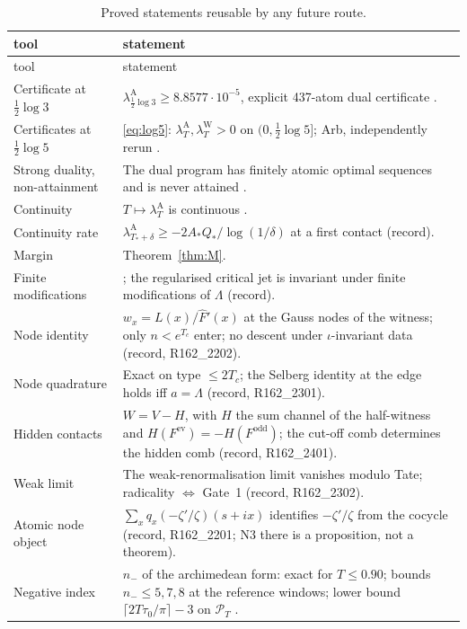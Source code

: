 \documentclass[11pt]{amsart}
\theoremstyle{definition}
\theoremstyle{remark}
\newcommand{\PT}{\mathcal P_T}
\newcommand{\lamA}{\lambda^{\mathrm A}_T}
\newcommand{\lamW}{\lambda^{\mathrm W}_T}
\begin{document}
\begin{longtable}{@{}p{4.2cm}p{10.3cm}@{}}
\caption{Proved statements reusable by any future route.}\label{tab:tools}\\
\toprule
tool & statement \\
\midrule\endfirsthead
\toprule tool & statement \\ \midrule\endhead
\bottomrule\endfoot
Certificate at $\frac12\log3$ & $\lambda^{\mathrm A}_{\frac12\log3}\ge8.8577\cdot10^{-5}$, explicit 437-atom dual certificate \cite[Thm.~5.1]{Paper47}. \\
Certificates at $\frac12\log5$ & \eqref{eq:log5}: $\lamA,\lamW>0$ on $(0,\frac12\log5]$; Arb, independently rerun \cite[Thm.~15.2]{Paper47}. \\
Strong duality, non-attainment & The dual program has finitely atomic optimal sequences and is never attained \cite[\S3]{Paper47}. \\
Continuity & $T\mapsto\lamA$ is continuous \cite[Lem.~17.1]{Paper47}. \\
Continuity rate & $\lambda^{\mathrm A}_{T_*+\delta}\ge-2A_*Q_*/\log(1/\delta)$ at a first contact (record). \\
Margin & Theorem~\ref{thm:M}. \\
Finite modifications & \cite[Thm.~12.5]{Paper47}; the regularised critical jet is invariant under finite modifications of $\Lambda$ (record). \\
Node identity & $w_x=L(x)/\widehat F'(x)$ at the Gauss nodes of the witness; only $n<e^{T_c}$ enter; no descent under $\iota$-invariant data (record, R162\_2202). \\
Node quadrature & Exact on type $\le2T_c$; the Selberg identity at the edge holds iff $a=\Lambda$ (record, R162\_2301). \\
Hidden contacts & $W=V-H$, with $H$ the sum channel of the half-witness and $H(F^{\mathrm{ev}})=-H(F^{\mathrm{odd}})$; the cut-off comb determines the hidden comb (record, R162\_2401). \\
Weak limit & The weak-renormalisation limit vanishes modulo Tate; radicality $\iff$ Gate~1 (record, R162\_2302). \\
Atomic node object & $\sum_xq_x(-\zeta'/\zeta)(s+ix)$ identifies $-\zeta'/\zeta$ from the cocycle (record, R162\_2201; N3 there is a proposition, not a theorem). \\
Negative index & $n_-$ of the archimedean form: exact for $T\le0.90$; bounds $n_-\le5,7,8$ at the reference windows; lower bound $\lceil2T\tau_0/\pi\rceil-3$ on $\PT$ \cite[\S10.2]{Paper47}. \\

\end{longtable}
\end{document}
